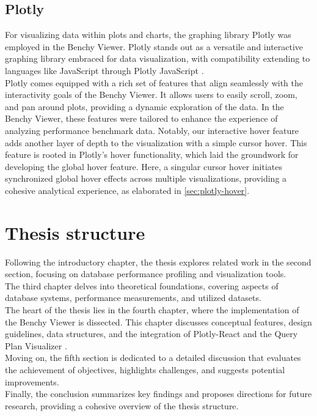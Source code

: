 \subsection{Plotly}

For visualizing data within plots and charts, the graphing library Plotly was employed in the Benchy Viewer. Plotly stands out as a versatile and interactive graphing library embraced for data visualization, with compatibility extending to languages like JavaScript through Plotly JavaScript \parencite{plotly-js}.\\
Plotly comes equipped with a rich set of features that align seamlessly with the interactivity goals of the Benchy Viewer. It allows users to easily scroll, zoom, and pan around plots, providing a dynamic exploration of the data. In the Benchy Viewer, these features were tailored to enhance the experience of analyzing performance benchmark data. Notably, our interactive hover feature adds another layer of depth to the visualization with a simple cursor hover. This feature is rooted in Plotly's hover functionality, which laid the groundwork for developing the global hover feature. Here, a singular cursor hover initiates synchronized global hover effects across multiple visualizations, providing a cohesive analytical experience, as elaborated in \ref{sec:plotly-hover}.


\section{Thesis structure}

Following the introductory chapter, the thesis explores related work in the second section, focusing on database performance profiling and visualization tools.\\
The third chapter delves into theoretical foundations, covering aspects of database systems, performance measurements, and utilized datasets.\\
The heart of the thesis lies in the fourth chapter, where the implementation of the Benchy Viewer is dissected. This chapter discusses conceptual features, design guidelines, data structures, and the integration of Plotly-React \parencite*{plotly} and the Query Plan Visualizer \parencite*{semantic-diff}.\\
Moving on, the fifth section is dedicated to a detailed discussion that evaluates the achievement of objectives, highlights challenges, and suggests potential improvements.\\
Finally, the conclusion summarizes key findings and proposes directions for future research, providing a cohesive overview of the thesis structure.